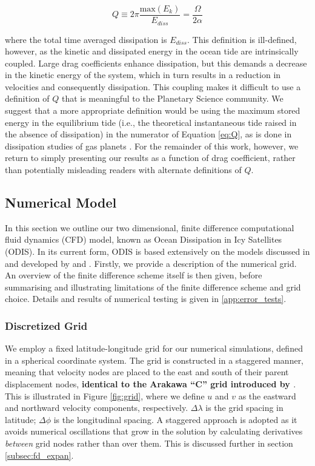 \begin{equation}\label{eq:Q}
Q \equiv 2 \pi \dfrac{\text{max} \left( E_{k} \right)}{E_{diss}} = \dfrac{\Omega}{2 \alpha}
\end{equation}

where the total time averaged dissipation is $E_{diss}$. This definition is ill-defined, however, as the kinetic and dissipated energy in the ocean tide are intrinsically coupled. Large drag coefficients enhance dissipation, but this demands a decrease in the kinetic energy of the system, which in turn results in a reduction in velocities and consequently dissipation. This coupling makes it difficult to use a definition of $Q$ that is meaningful to the Planetary Science community. We suggest that a more appropriate definition would be using the maximum stored energy in the equilibrium tide (i.e., the theoretical instantaneous tide raised in the absence of dissipation) in the numerator of Equation \ref{eq:Q}, as is done in dissipation studies of gas planets \citep{goldreich1966q}. For the remainder of this work, however, we return to simply presenting our results as a function of drag coefficient, rather than potentially misleading readers with alternate definitions of $Q$. 

\subsection{Numerical Model \label{subsec:model}}

In this section we outline our two dimensional, finite difference computational fluid dynamics (CFD) model, known as Ocean Dissipation in Icy Satellites (ODIS). In its current form, ODIS is based extensively on the models discussed in and developed by \citet{zahel1973diurnalk,zahel1978influence} and \citet{sears1994tidal,sears1995tidal}.
Firstly, we provide a description of the numerical grid. An overview of the finite difference scheme itself is then given, before summarising and illustrating limitations of the finite difference scheme and grid choice. Details and results of numerical testing is given in \ref{app:error_tests}.  

\subsubsection{Discretized Grid \label{subsec:grid}}

We employ a fixed latitude-longitude grid for our numerical simulations, defined in a spherical coordinate system. The grid is constructed in a staggered manner, meaning that velocity nodes are placed to the east and south of their parent displacement nodes, \textbf{identical to the Arakawa ``C'' grid introduced by \citet{arakawa1977computational}}. This is illustrated in Figure \ref{fig:grid}, where we define $u$ and $v$ as the eastward and northward velocity components, respectively. $\Delta \lambda$ is the grid spacing in latitude; $\Delta \phi$ is the longitudinal spacing. A staggered approach is adopted as it avoids numerical oscillations that grow in the solution by calculating derivatives \textit{between} grid nodes rather than over them. This is discussed further in section \ref{subsec:fd_expan}.

